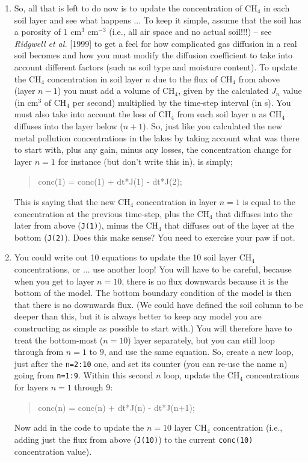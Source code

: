 \documentclass{tufte-book} %
\newenvironment{docspec}{\begin{quotation}\ttfamily\parskip0pt\parindent0pt\ignorespaces}{\end{quotation}}
\begin{document}
\begin{enumerate}
\item
So, all that is left to do now is to update the concentration of CH\(_{4}\) in each soil layer and see what happens ... To keep it simple, assume that the soil has a porosity of 1 cm\(^{3}\) cm\(^{-3}\) (i.e., all air space and no actual soil!!!) -- see \textit{Ridgwell et al.} [1999] to get a feel for how complicated gas diffusion in a real soil becomes and how you must modify the diffusion coefficient to take into account different factors (such as soil type and moisture content). To update the CH\(_{4}\) concentration in soil layer \(n\) due to the flux of CH\(_{4}\) from above (layer \(n-1\)) you must add a volume of CH\(_{4}\), given by the calculated \(J_{n}\) value (in cm\(^{3}\) of CH\(_{4}\) per second) multiplied by the time-step interval (in s). You must also take into account the loss of CH\(_{4}\) from each soil layer n as CH\(_{4}\) diffuses into the layer below (\(n+1\)). So, just like you calculated the new metal pollution concentrations in the lakes by taking account what was there to start with, plus any gain, minus any losses, the concentration change for layer \(n=1\) for instance (but don't write this in), is simply;
\begin{docspec}
conc(1) = conc(1) + dt*J(1) - dt*J(2);
\end{docspec}
This is saying that the new CH\(_{4}\) concentration in layer \(n=1\) is equal to the concentration at the previous time-step, plus the CH\(_{4}\) that diffuses into the later from above (\texttt{J(1)}), minus the CH\(_{4}\) that diffuses out of the layer at the bottom (\texttt{J(2)}). Does this make sense? You need to exercise your paw if not.

\item
You could write out 10 equations to update the 10 soil layer CH\(_{4}\) concentrations, or ... use another loop! You will have to be careful, because when you get to layer \(n=10\), there is no flux downwards because it is the bottom of the model. The bottom boundary condition of the model is then that there is no downwards flux. (We could have defined the soil column to be deeper than this, but it is always better to keep any model you are constructing as simple as possible to start with.) You will therefore have to treat the bottom-most (\(n=10\)) layer separately, but you can still loop through from \(n= 1\) to \(9\), and use the same equation. So, create a new loop, just after the \texttt{n=2:10} one, and set its counter (you can re-use the name n) going from \texttt{n=1:9}. Within this second \(n\) loop, update the CH\(_{4}\) concentrations for layers \(n = 1\) through \(9\):
\begin{docspec}
conc(n) = conc(n) + dt*J(n) - dt*J(n+1);
\end{docspec}
Now add in the code to update the \(n=10\) layer CH\(_{4}\) concentration (i.e., adding just the flux from above (\texttt{J(10)}) to the current \texttt{conc(10)} concentration value).

\end{enumerate}
\end{document}
